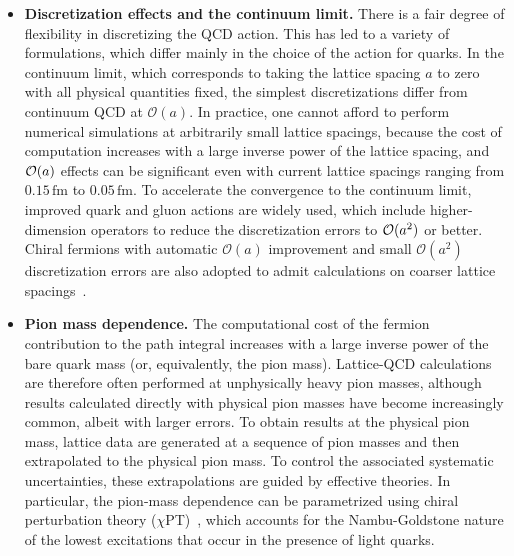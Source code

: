 \begin{itemize}

\item {\bfseries Discretization effects and the continuum limit.} 
There is a fair degree of flexibility in discretizing the QCD action. 
%
This has led to a variety of formulations, which differ mainly in the choice of
the action for quarks.
%
In the continuum limit, which corresponds to taking
the lattice spacing $a$ to zero with all physical quantities fixed,
the simplest discretizations differ from continuum QCD at ${\mathcal
O}(a)$.
%
In practice, one cannot afford to perform numerical
simulations at arbitrarily small lattice spacings, because the cost of
computation increases with a large inverse power of the lattice
spacing, and ${\cal O}(a)$ effects can be significant even
with current lattice spacings ranging from $0.15 \,\mbox{fm}$ to
$0.05 \,\mbox{fm}$.
%
To accelerate the convergence to the continuum
limit, improved quark and gluon actions are widely used, which include
higher-dimension operators to reduce the discretization errors to
${\cal O}(a^2)$ or better.
%
Chiral fermions with automatic $\mathcal{O}(a)$ improvement and small 
$\mathcal{O}(a^2)$ discretization errors are also adopted to admit 
calculations on coarser lattice spacings~\cite{Creutz:2011hy,Vladikas:2011bp,
Chandrasekharan:2004cn}. 

\item {\bfseries Pion mass dependence.} 
The computational cost of the fermion contribution to the path
integral increases with a large inverse power of the bare quark mass
(or, equivalently, the pion mass).
%
Lattice-QCD calculations are therefore
often performed at unphysically heavy pion masses, although results calculated
directly with physical pion masses have become increasingly common, albeit with larger
errors.
%
To obtain results at the physical pion mass, lattice data are
generated at a sequence of pion masses and then extrapolated to the
physical pion mass.
%
To control the associated systematic
uncertainties, these extrapolations are guided by effective
theories.
%
In particular, the pion-mass dependence can be parametrized
using chiral perturbation theory ($\chi$PT)~\cite{Golterman:2009kw}, 
which accounts for the
Nambu-Goldstone nature of the lowest excitations that occur in the
presence of light quarks. 
%


\end{itemize}
